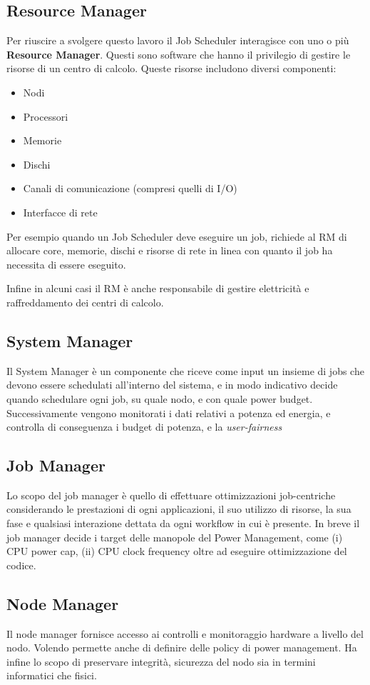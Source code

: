 \subsection{Resource Manager}
Per riuscire a svolgere questo lavoro il Job Scheduler interagisce con uno o più \textbf{Resource Manager}. Questi sono software che hanno il privilegio di gestire le risorse di un centro di calcolo. Queste risorse includono diversi componenti:
\begin{itemize}
    \item Nodi
    \item Processori
    \item Memorie
    \item Dischi
    \item Canali di comunicazione (compresi quelli di I/O)
    \item Interfacce di rete 
\end{itemize}
Per esempio quando un Job Scheduler deve eseguire un job, richiede al RM di allocare core, memorie, dischi e risorse di rete in linea con quanto il job ha necessita di essere eseguito.

Infine in alcuni casi il RM è anche responsabile di gestire elettricità e raffreddamento dei centri di calcolo.

\subsection{System Manager}
Il System Manager è un componente che riceve come input un insieme di jobs che devono essere schedulati all'interno del sistema, e in modo indicativo decide quando schedulare ogni job, su quale nodo, e con quale power budget. Successivamente vengono monitorati i dati relativi a potenza ed energia, e controlla di conseguenza i budget di potenza, e la \emph{user-fairness}

\subsection{Job Manager}
Lo scopo del job manager è quello di effettuare ottimizzazioni job-centriche considerando le prestazioni di ogni applicazioni, il suo utilizzo di risorse, la sua fase e qualsiasi interazione dettata da ogni workflow in cui è presente. In breve il job manager decide i target delle manopole del Power Management, come (i) CPU power cap, (ii) CPU clock frequency oltre ad eseguire ottimizzazione del codice.

\subsection{Node Manager}
Il node manager fornisce accesso ai controlli e monitoraggio hardware a livello del nodo. Volendo permette anche di definire delle policy di power management. Ha infine lo scopo di preservare integrità, sicurezza del nodo sia in termini informatici che fisici.


